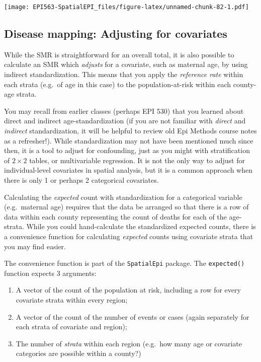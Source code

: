 \documentclass[
]{book}
\newcommand{\passthrough}[1]{#1}
\providecommand{\tightlist}{%
  \setlength{\itemsep}{0pt}\setlength{\parskip}{0pt}}
\begin{document}
\texttt{[image: EPI563-SpatialEPI\_files/figure-latex/unnamed-chunk-82-1.pdf]}

\hypertarget{disease-mapping-adjusting-for-covariates}{%
\subsection{Disease mapping: Adjusting for covariates}\label{disease-mapping-adjusting-for-covariates}}

While the SMR is straightforward for an overall total, it is also possible to calculate an SMR which \emph{adjusts} for a covariate, such as maternal age, by using indirect standardization. This means that you apply the \emph{reference rate} within each strata (e.g.~of age in this case) to the population-at-risk within each county-age strata.

You may recall from earlier classes (perhaps EPI 530) that you learned about direct and indirect age-standardization (if you are not familiar with \emph{direct} and \emph{indirect} standardization, it will be helpful to review old Epi Methods course notes as a refresher!). While standardization may not have been mentioned much since then, it is a tool to adjust for confounding, just as you might with stratification of \(2\times 2\) tables, or multivariable regression. It is not the only way to adjust for individual-level covariates in spatial analysis, but it is a common approach when there is only 1 or perhaps 2 categorical covariates.

Calculating the \emph{expected} count with standardization for a categorical variable (e.g.~maternal age) requires that the data be arranged so that there is a row of data within each county representing the count of deaths for each of the age-strata. While you could hand-calculate the standardized expected counts, there is a convenience function for calculating \emph{expected} counts using covariate strata that you may find easier.

The convenience function is part of the \passthrough{\lstinline!SpatialEpi!} package. The \passthrough{\lstinline!expected()!} function expects 3 arguments:

\begin{enumerate}
\def\labelenumi{\arabic{enumi}.}
\tightlist
\item
  A vector of the count of the population at risk, including a row for every covariate strata within every region;
\item
  A vector of the count of the number of events or cases (again separately for each strata of covariate and region);
\item
  The number of \emph{strata} within each region (e.g.~how many age or covariate categories are possible within a county?)
\end{enumerate}
\end{document}
